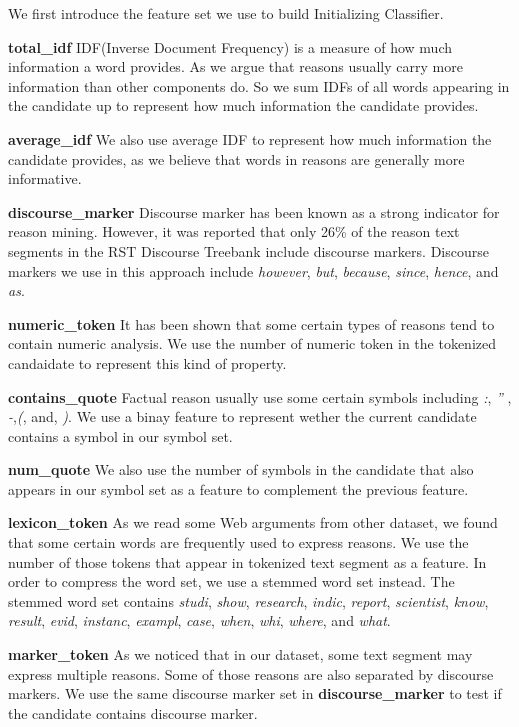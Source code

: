 \documentclass[11pt,a4paper]{article}
\begin{document}
We first introduce the feature set we use to build Initializing Classifier.

{\bf total\_idf} IDF(Inverse Document Frequency) is a measure of how much information a word provides\cite{salton1986introduction}. As we argue that reasons usually carry more information than other components do. So we sum IDFs of all words appearing in the candidate up to represent how much information the candidate provides.  

{\bf average\_idf} We also use average IDF to represent how much information the candidate provides, as we believe that words in reasons are generally more informative.

{\bf discourse\_marker} Discourse marker has been known as a strong indicator for reason mining\cite{stab2014argumentation}. However, it was reported that only 26\% of the reason text segments in the RST Discourse Treebank include discourse markers\cite{marcu2002unsupervised}. Discourse markers we use in this approach include {\it however}, {\it but}, {\it because}, {\it since}, {\it hence}, and {\it as}.

{\bf numeric\_token} It has been shown that some certain types of reasons tend to contain numeric analysis\cite{rinott2015show}. We use the number of numeric token in the tokenized candaidate to represent this kind of property.

{\bf contains\_quote} Factual reason usually use some certain symbols including {\it :}, {\it ''} , {\it -},{\it (}, and, {\it )}\cite{rinott2015show}.  We use a binay feature to represent wether the current candidate contains a symbol in our symbol set.

{\bf num\_quote} We also use the number of symbols in the candidate that also appears in our symbol set as a feature to complement the previous feature.

{\bf lexicon\_token} As we read some Web arguments from other dataset, we found that some certain words are frequently used to express reasons. We use the number of those tokens that appear in tokenized text segment as a feature. In order to compress the word set, we use a stemmed word set instead. The stemmed word set contains {\it studi}, {\it show}, {\it research}, {\it indic}, {\it report}, {\it scientist}, {\it know}, {\it result}, {\it evid}, {\it instanc}, {\it exampl},  {\it case},  {\it when},  {\it whi},  {\it where}, and {\it what}.

{\bf marker\_token} As we noticed that in our dataset, some text segment may express multiple reasons. Some of those reasons are also separated by discourse markers. We use the same discourse marker set in {\bf discourse\_marker} to test if the candidate contains discourse marker.
\end{document}
